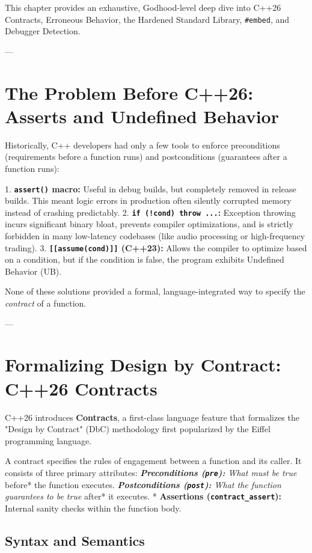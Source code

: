 {{{{{{This chapter provides an exhaustive, Godhood-level deep dive into C++26 Contracts, Erroneous Behavior, the Hardened Standard Library, \texttt{#embed}, and Debugger Detection.

---

\section{The Problem Before C++26: Asserts and Undefined Behavior}

Historically, C++ developers had only a few tools to enforce preconditions (requirements before a function runs) and postconditions (guarantees after a function runs):

1. \textbf{\texttt{assert()} macro:} Useful in debug builds, but completely removed in release builds. This meant logic errors in production often silently corrupted memory instead of crashing predictably.
2. \textbf{\texttt{if (!cond) throw ...}:} Exception throwing incurs significant binary bloat, prevents compiler optimizations, and is strictly forbidden in many low-latency codebases (like audio processing or high-frequency trading).
3. \textbf{\texttt{[[assume(cond)]]} (C++23):} Allows the compiler to optimize based on a condition, but if the condition is false, the program exhibits Undefined Behavior (UB).

None of these solutions provided a formal, language-integrated way to specify the \textit{contract} of a function.

---

\section{Formalizing Design by Contract: C++26 Contracts}

C++26 introduces \textbf{Contracts}, a first-class language feature that formalizes the "Design by Contract" (DbC) methodology first popularized by the Eiffel programming language.

A contract specifies the rules of engagement between a function and its caller. It consists of three primary attributes:
\textit{   \textbf{Preconditions (\texttt{pre}):} What must be true }before* the function executes.
\textit{   \textbf{Postconditions (\texttt{post}):} What the function guarantees to be true }after* it executes.
*   \textbf{Assertions (\texttt{contract_assert}):} Internal sanity checks within the function body.

\subsection{Syntax and Semantics}

}}}}}}

